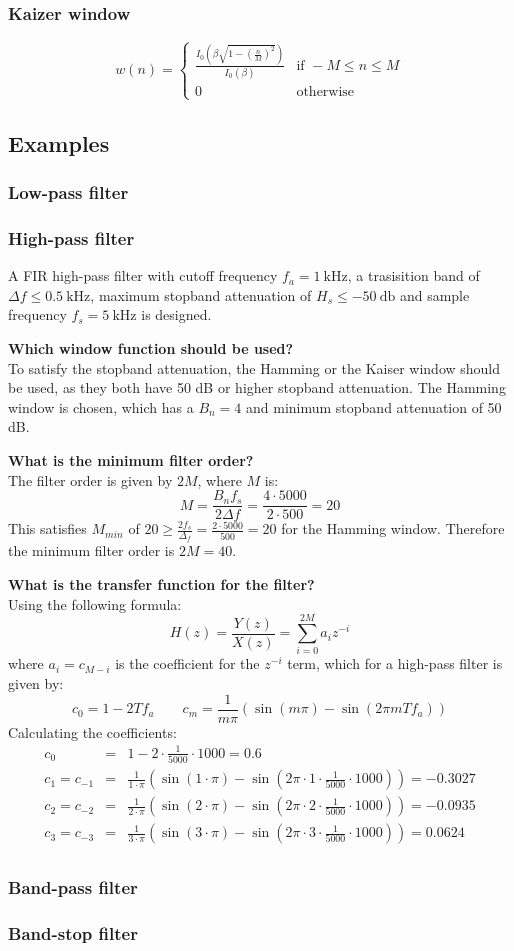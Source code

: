 \subsubsection{Kaizer window}
$$w(n)=\begin{cases}
  \frac{I_0\left(\beta\sqrt{1-\left(\frac{n}{M}\right)^{2}}\right)}{I_0(\beta)}& \text{if } -M\leq n\leq M\\
0 & \text{otherwise}
\end{cases}$$

\subsection{Examples}
\subsubsection{Low-pass filter}
\subsubsection{High-pass filter}
A FIR high-pass filter with cutoff frequency $f_{a}=\SI{1}{\kilo\hertz}$, a trasisition band of $\Delta f\leq\SI{0.5}{\kilo\hertz}$, maximum stopband attenuation of $H_s\leq\SI{-50}{\decibel}$ and sample frequency $f_s=\SI{5}{\kilo\hertz}$ is designed.

\textbf{Which window function should be used?}\\
To satisfy the stopband attenuation, the Hamming or the Kaiser window should be used, as they both have 50 dB or higher stopband attenuation.
The Hamming window is chosen, which has a $B_n=4$ and minimum stopband attenuation of 50 dB.

\textbf{What is the minimum filter order?}\\
The filter order is given by $2M$, where $M$ is:
$$M=\frac{B_nf_s}{2\Delta f}=\frac{4\cdot5000}{2\cdot 500}=20$$
This satisfies $M_{min}$ of $20\geq\frac{2f_s}{\Delta_f}=\frac{2\cdot5000}{500}=20$ for the Hamming window.
Therefore the minimum filter order is $2M=40$.

\textbf{What is the transfer function for the filter?}\\
Using the following formula:
$$H(z)=\frac{Y(z)}{X(z)}=\sum_{i=0}^{2M}a_iz^{-i}$$
where $a_i=c_{M-i}$ is the coefficient for the $z^{-i}$ term, which for a high-pass filter is given by:
$$c_0=1-2Tf_a\qquad c_m=\frac{1}{m\pi}(\sin(m\pi)-\sin(2\pi m T f_{a}))$$
Calculating the coefficients:
\begin{eqnarray*}
c_0&=&1-2\cdot\frac{1}{5000}\cdot1000=0.6\\
c_1=c_{-1}&=&\frac{1}{1\cdot\pi}\left(\sin(1\cdot\pi)-\sin(2\pi\cdot 1\cdot\frac{1}{5000}\cdot1000)\right)=-0.3027\\
c_2=c_{-2}&=&\frac{1}{2\cdot\pi}\left(\sin(2\cdot\pi)-\sin(2\pi\cdot 2\cdot\frac{1}{5000}\cdot1000)\right)=-0.0935\\
c_3=c_{-3}&=&\frac{1}{3\cdot\pi}\left(\sin(3\cdot\pi)-\sin(2\pi\cdot 3\cdot\frac{1}{5000}\cdot1000)\right)=0.0624\\
\end{eqnarray*}
\subsubsection{Band-pass filter}
\subsubsection{Band-stop filter}
